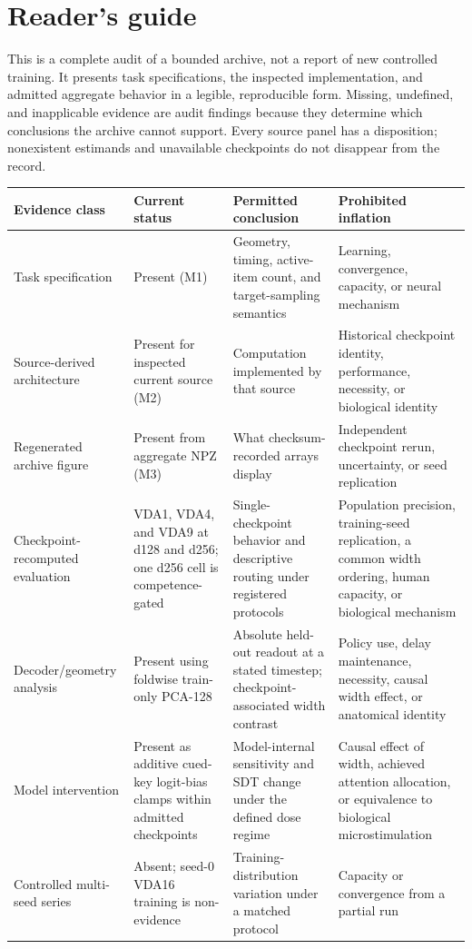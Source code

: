 \documentclass[11pt,a4paper]{article}
\begin{document}
\section*{Reader's guide}
This is a complete audit of a bounded archive, not a report of new controlled training. It presents task specifications, the inspected implementation, and admitted aggregate behavior in a legible, reproducible form. Missing, undefined, and inapplicable evidence are audit findings because they determine which conclusions the archive cannot support. Every source panel has a disposition; nonexistent estimands and unavailable checkpoints do not disappear from the record.

\begingroup\small
\begin{tabularx}{\textwidth}{@{}p{3.5cm}p{2.7cm}Y Y@{}}
\toprule
\textbf{Evidence class} & \textbf{Current status} & \textbf{Permitted conclusion} & \textbf{Prohibited inflation}\\
\midrule
Task specification & Present (M1) & Geometry, timing, active-item count, and target-sampling semantics & Learning, convergence, capacity, or neural mechanism\\
Source-derived architecture & Present for inspected current source (M2) & Computation implemented by that source & Historical checkpoint identity, performance, necessity, or biological identity\\
Regenerated archive figure & Present from aggregate NPZ (M3) & What checksum-recorded arrays display & Independent checkpoint rerun, uncertainty, or seed replication\\
Checkpoint-recomputed evaluation & VDA1, VDA4, and VDA9 at d128 and d256; one d256 cell is competence-gated & Single-checkpoint behavior and descriptive routing under registered protocols & Population precision, training-seed replication, a common width ordering, human capacity, or biological mechanism\\
Decoder/geometry analysis & Present using foldwise train-only PCA-128 & Absolute held-out readout at a stated timestep; checkpoint-associated width contrast & Policy use, delay maintenance, necessity, causal width effect, or anatomical identity\\
Model intervention & Present as additive cued-key logit-bias clamps within admitted checkpoints & Model-internal sensitivity and SDT change under the defined dose regime & Causal effect of width, achieved attention allocation, or equivalence to biological microstimulation\\
Controlled multi-seed series & Absent; seed-0 VDA16 training is non-evidence & Training-distribution variation under a matched protocol & Capacity or convergence from a partial run\\
\bottomrule
\end{tabularx}
\endgroup
\end{document}
